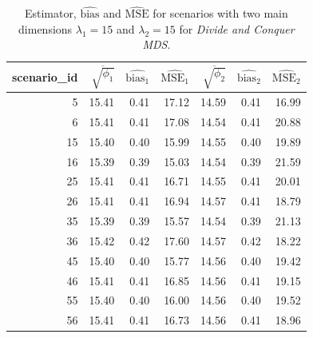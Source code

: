 \documentclass[11pt]{report}
\begin{document}
\begin{table}[ht]
\centering
\begin{tabular}{rrrrrrr}
 scenario\_id & $\overline{\sqrt{\phi_1}}$ & $\widehat{\mbox{bias}_1}$ & $\widehat{\mbox{MSE}_1}$ & $\overline{\sqrt{\phi_2}}$ & $\widehat{\mbox{bias}_2}$ & $\widehat{\mbox{MSE}_2}$ \\ 
  \hline
  5 & 15.41 & 0.41 & 17.12 & 14.59 & 0.41 & 16.99 \\ 
  6 & 15.41 & 0.41 & 17.08 & 14.54 & 0.41 & 20.88 \\ 
  15 & 15.40 & 0.40 & 15.99 & 14.55 & 0.40 & 19.89 \\ 
  16 & 15.39 & 0.39 & 15.03 & 14.54 & 0.39 & 21.59 \\ 
  25 & 15.41 & 0.41 & 16.71 & 14.55 & 0.41 & 20.01 \\ 
  26 & 15.41 & 0.41 & 16.94 & 14.57 & 0.41 & 18.79 \\ 
  35 & 15.39 & 0.39 & 15.57 & 14.54 & 0.39 & 21.13 \\ 
  36 & 15.42 & 0.42 & 17.60 & 14.57 & 0.42 & 18.22 \\ 
  45 & 15.40 & 0.40 & 15.77 & 14.56 & 0.40 & 19.42 \\ 
  46 & 15.41 & 0.41 & 16.85 & 14.56 & 0.41 & 19.15 \\ 
  55 & 15.40 & 0.40 & 16.00 & 14.56 & 0.40 & 19.52 \\ 
  56 & 15.41 & 0.41 & 16.73 & 14.56 & 0.41 & 18.96 \\ 
   \hline
\end{tabular}
\caption{Estimator, $\widehat{\mbox{bias}}$ and $\widehat{\mbox{MSE}}$ for scenarios with two main dimensions $\lambda_1 = 15$ and $\lambda_2 = 15$ for \textit{Divide and Conquer MDS}.}
\end{table}

\FloatBarrier
\end{document}

